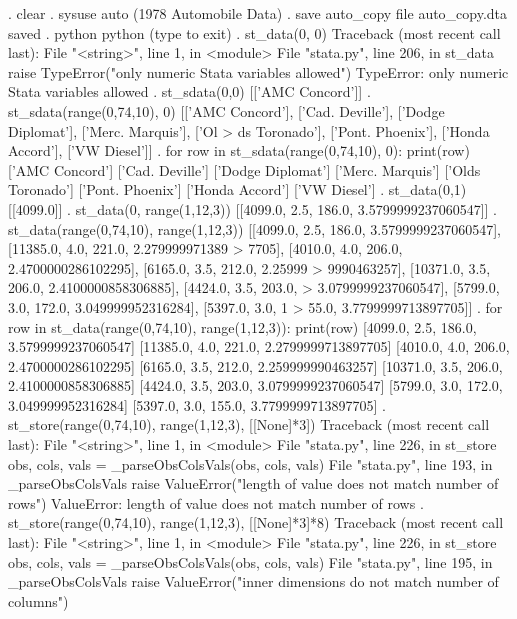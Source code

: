 \documentclass{article}
\begin{document}
\begin{stlog}
. clear
{\smallskip}
. sysuse auto
(1978 Automobile Data)
{\smallskip}
. save auto_copy
file auto_copy.dta saved
{\smallskip}
. python
 python (type {} to exit) 
. st_data(0, 0)
{\color{red}Traceback (most recent call last):
  File "<string>", line 1, in <module>
  File "stata.py", line 206, in st_data
    raise TypeError("only numeric Stata variables allowed")
TypeError: only numeric Stata variables allowed}
{\smallskip}
. st_sdata(0,0)
[['AMC Concord']]
{\smallskip}
. st_sdata(range(0,74,10), 0)
[['AMC Concord'], ['Cad. Deville'], ['Dodge Diplomat'], ['Merc. Marquis'], ['Ol
> ds Toronado'], ['Pont. Phoenix'], ['Honda Accord'], ['VW Diesel']]
{\smallskip}
. for row in st_sdata(range(0,74,10), 0): print(row)
['AMC Concord']
['Cad. Deville']
['Dodge Diplomat']
['Merc. Marquis']
['Olds Toronado']
['Pont. Phoenix']
['Honda Accord']
['VW Diesel']
{\smallskip}
. st_data(0,1)
[[4099.0]]
{\smallskip}
. st_data(0, range(1,12,3))
[[4099.0, 2.5, 186.0, 3.5799999237060547]]
{\smallskip}
. st_data(range(0,74,10), range(1,12,3))
[[4099.0, 2.5, 186.0, 3.5799999237060547], [11385.0, 4.0, 221.0, 2.279999971389
> 7705], [4010.0, 4.0, 206.0, 2.4700000286102295], [6165.0, 3.5, 212.0, 2.25999
> 9990463257], [10371.0, 3.5, 206.0, 2.4100000858306885], [4424.0, 3.5, 203.0, 
> 3.0799999237060547], [5799.0, 3.0, 172.0, 3.049999952316284], [5397.0, 3.0, 1
> 55.0, 3.7799999713897705]]
{\smallskip}
. for row in st_data(range(0,74,10), range(1,12,3)): print(row)
[4099.0, 2.5, 186.0, 3.5799999237060547]
[11385.0, 4.0, 221.0, 2.2799999713897705]
[4010.0, 4.0, 206.0, 2.4700000286102295]
[6165.0, 3.5, 212.0, 2.259999990463257]
[10371.0, 3.5, 206.0, 2.4100000858306885]
[4424.0, 3.5, 203.0, 3.0799999237060547]
[5799.0, 3.0, 172.0, 3.049999952316284]
[5397.0, 3.0, 155.0, 3.7799999713897705]
{\smallskip}
. st_store(range(0,74,10), range(1,12,3), [[None]*3])
{\color{red}Traceback (most recent call last):
  File "<string>", line 1, in <module>
  File "stata.py", line 226, in st_store
    obs, cols, vals = _parseObsColsVals(obs, cols, vals)
  File "stata.py", line 193, in _parseObsColsVals
    raise ValueError("length of value does not match number of rows")
ValueError: length of value does not match number of rows}
{\smallskip}
. st_store(range(0,74,10), range(1,12,3), [[None]*3]*8)
{\color{red}Traceback (most recent call last):
  File "<string>", line 1, in <module>
  File "stata.py", line 226, in st_store
    obs, cols, vals = _parseObsColsVals(obs, cols, vals)
  File "stata.py", line 195, in _parseObsColsVals
    raise ValueError("inner dimensions do not match number of columns")
}
\end{stlog}
\end{document}
